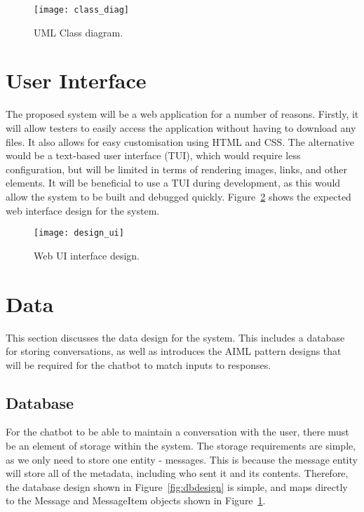 \begin{figure}[h]
	\begin{center}
		\texttt{[image: class\_diag]}
	\end{center}
	\caption{UML Class diagram.}
	\label{fig:class_diagram}
\end{figure}

\newpage
\section{User Interface}
The proposed system will be a web application for a number of reasons. Firstly, it will allow testers to easily access the application without having to download any files. It also allows for easy customisation using HTML and CSS. The alternative would be a text-based user interface (TUI), which would require less configuration, but will be limited in terms of rendering images, links, and other elements. It will be beneficial to use a TUI during development, as this would allow the system to be built and debugged quickly. Figure~\ref{fig:design_ui} shows the expected web interface design for the system.

\begin{figure}[h]
	\begin{center}
		\texttt{[image: design\_ui]}
	\end{center}
	\caption{Web UI interface design.}
	\label{fig:design_ui}
\end{figure}

\section{Data}
This section discusses the data design for the system. This includes a database for storing conversations, as well as introduces the AIML pattern designs that will be required for the chatbot to match inputs to responses.

\subsection{Database}
For the chatbot to be able to maintain a conversation with the user, there must be an element of storage within the system. The storage requirements are simple, as we only need to store one entity - messages. This is because the message entity will store all of the metadata, including who sent it and its contents. Therefore, the database design shown in Figure~\ref{fig:dbdesign} is simple, and maps directly to the Message and MessageItem objects shown in Figure~\ref{fig:class_diagram}.


